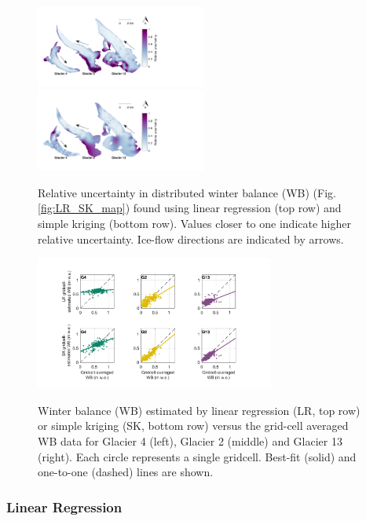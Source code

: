 \documentclass[review,oneside, letterpaper]{igs} %
\begin{document}
\begin{figure}
	\centering
	\includegraphics[width =0.5\textwidth]{SpatialVar_LR.pdf}\\
	\includegraphics[width =0.5\textwidth]{SpatialVar_SK.pdf}\\
	\caption{Relative uncertainty in distributed winter balance (WB) (Fig. \ref{fig:LR_SK_map}) found using linear regression (top row) and simple kriging (bottom row). Values closer to one indicate higher relative uncertainty. Ice-flow directions are indicated by arrows.}
	\label{fig:WSMBspatialvar}
\end{figure}

\begin{figure}
	\centering
	\includegraphics[width =0.7\textwidth]{observedVSestimated_S2.pdf}\\
	\caption{Winter balance (WB) estimated by linear regression (LR, top row) or simple kriging (SK, bottom row) versus the grid-cell averaged WB data for Glacier 4 (left), Glacier 2 (middle) and Glacier 13 (right). Each circle represents a single gridcell. Best-fit (solid) and one-to-one (dashed) lines are shown.}
	\label{fig:observedVSestimated_S2}
\end{figure}

\subsubsection{Linear Regression}
\end{document}
